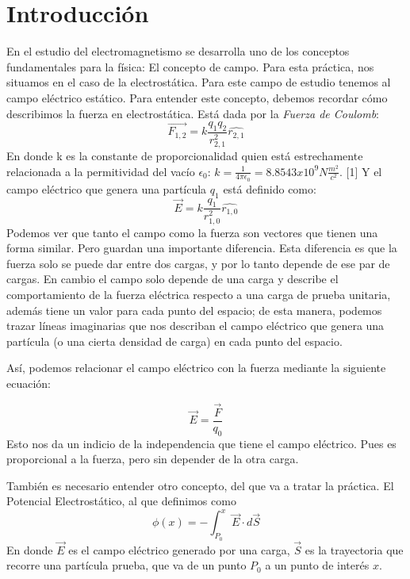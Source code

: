 \documentclass[article,12pt]{elsarticle}
\begin{document}
\section{Introducción}
En el estudio del electromagnetismo se desarrolla uno de los conceptos fundamentales para la física: El concepto de campo.
Para esta práctica, nos situamos en el caso de la electrostática. Para este campo de estudio tenemos al campo eléctrico estático. Para entender este concepto, debemos recordar cómo describimos la fuerza en electrostática. Está dada por la \textit{Fuerza de Coulomb}:
\begin{equation}
    \Vec{F_{1,2}}=k\frac{q_{1}q_{2}}{r_{2,1}^2}\hat{r_{2,1}}
\end{equation}
En donde k es la constante de proporcionalidad quien está estrechamente relacionada a la permitividad del vacío $\epsilon_0$: $k=\frac{1}{4\pi\epsilon_{0}}=8.8543x10^9 N\frac{m^2}{c^2}$. [1]
Y el campo eléctrico que genera una partícula $q_{1}$ está definido como:
\begin{equation}
    \Vec{E}=k\frac{q_{1}}{r_{1,0}^2}\hat{r_{1,0}}
\end{equation}
Podemos ver que tanto el campo como la fuerza son vectores que tienen una forma similar. Pero guardan una importante diferencia. Esta diferencia es que la fuerza solo se puede dar entre dos cargas, y por lo tanto depende de ese par de cargas. En cambio el campo solo depende de una carga y describe el comportamiento de la fuerza eléctrica respecto a una carga de prueba unitaria, además tiene un valor para cada punto del espacio; de esta manera, podemos trazar líneas imaginarias que nos describan el campo eléctrico que genera una partícula (o una cierta densidad de carga) en cada punto del espacio.

Así, podemos relacionar el campo eléctrico con la fuerza mediante la siguiente ecuación:

\begin{equation}
    \Vec{E}=\frac{\Vec{F}}{q_0}
\end{equation}
Esto nos da un indicio de la independencia que tiene el campo eléctrico. Pues es proporcional a la fuerza, pero sin depender de la otra carga.

También es necesario entender otro concepto, del que va a tratar la práctica. El Potencial Electrostático, al que definimos como
\begin{equation}
    \phi(x) = - \int_{P_0}^{x} \Vec{E} \cdot d\Vec{S}
\end{equation}
En donde $\Vec{E}$ es el campo eléctrico generado por una carga, $\Vec{S}$ es la trayectoria que recorre una partícula prueba, que va de un punto ${P_0}$ a un punto de interés ${x}$.
\end{document}
